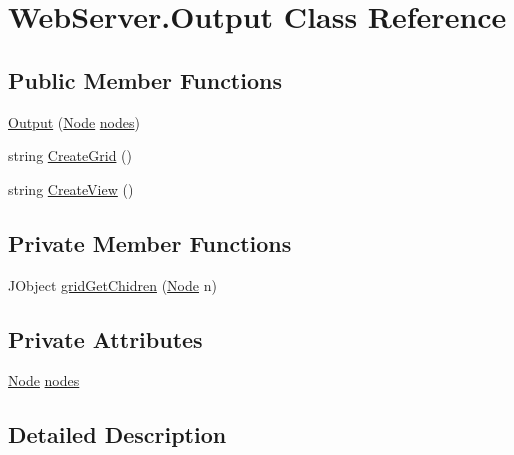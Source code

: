 \hypertarget{class_web_server_1_1_output}{}\section{Web\+Server.\+Output Class Reference}
\label{class_web_server_1_1_output}


 


\subsection*{Public Member Functions}
\begin{DoxyCompactItemize}
\item 
\hyperlink{class_web_server_1_1_output_ae3a25c0f36552504766dd7119c4db56d}{Output} (\hyperlink{class_web_server_1_1_node}{Node} \hyperlink{class_web_server_1_1_output_a8ff5484358c14b3f8479056f1b978790}{nodes})
\item 
string \hyperlink{class_web_server_1_1_output_a422c76e72ef2cb2f4d1a270230c15e15}{Create\+Grid} ()
\item 
string \hyperlink{class_web_server_1_1_output_ae225611e27b45862d87fffd78a4c567a}{Create\+View} ()
\end{DoxyCompactItemize}
\subsection*{Private Member Functions}
\begin{DoxyCompactItemize}
\item 
J\+Object \hyperlink{class_web_server_1_1_output_a236a91df7171746a519133dfdc578777}{grid\+Get\+Chidren} (\hyperlink{class_web_server_1_1_node}{Node} n)
\end{DoxyCompactItemize}
\subsection*{Private Attributes}
\begin{DoxyCompactItemize}
\item 
\hyperlink{class_web_server_1_1_node}{Node} \hyperlink{class_web_server_1_1_output_a8ff5484358c14b3f8479056f1b978790}{nodes}
\end{DoxyCompactItemize}


\subsection{Detailed Description}




